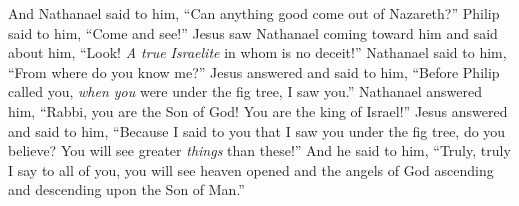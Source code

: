 \begin{biblechapter}
\verse And Nathanael said to him, “Can anything good come out of Nazareth?” Philip said to him, “Come and see!”
\verse Jesus saw Nathanael coming toward him and said about him, “Look! \textit{A true Israelite} in whom is no deceit!”
\verse Nathanael said to him, “From where do you know me?” Jesus answered and said to him, “Before Philip called you, \textit{when you} were under the fig tree, I saw you.”
\verse Nathanael answered him, “Rabbi, you are the Son of God! You are the king of Israel!”
\verse Jesus answered and said to him, “Because I said to you that I saw you under the fig tree, do you believe? You will see greater \textit{things} than these!”
\verse And he said to him, “Truly, truly I say to all of you, you will see heaven opened and the angels of God ascending and descending upon the Son of Man.”
\end{biblechapter}

